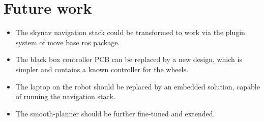 \documentclass[a4paper]{article}
\begin{document}
\section{Future work}

\begin{itemize}
  \item The skynav navigation stack could be transformed to work via the plugin system of
    move base ros package.
  \item The black box controller PCB can be replaced by a new design, which is simpler
    and contains a known controller for the wheels.
  \item The laptop on the robot should be replaced by an embedded solution, capable of
    running the navigation stack.
  \item The smooth-planner should be further fine-tuned and extended.
\end{itemize}
\end{document}
